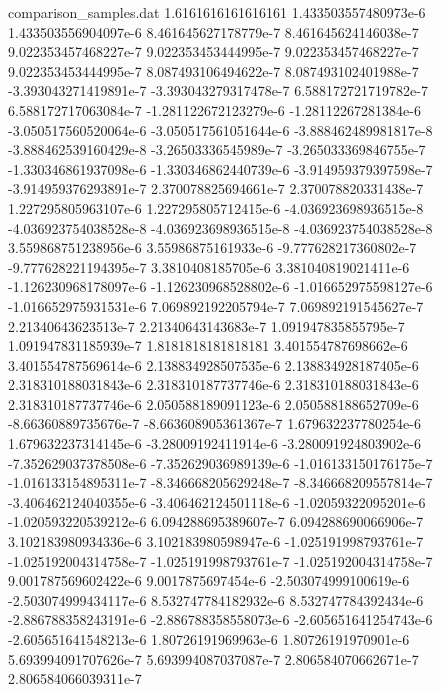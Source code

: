 \begin{filecontents}{comparison_samples.dat}
1.6161616161616161  1.433503557480973e-6    1.433503556904097e-6    8.461645627178779e-7   8.461645624146038e-7   9.022353457468227e-7   9.022353453444995e-7   9.022353457468227e-7   9.022353453444995e-7   8.087493106494622e-7   8.087493102401988e-7   -3.393043271419891e-7   -3.393043279317478e-7   6.588172721719782e-7   6.588172717063084e-7   -1.281122672123279e-6   -1.28112267281384e-6    -3.050517560520064e-6   -3.050517561051644e-6   -3.888462489981817e-8   -3.888462539160429e-8   -3.26503336545989e-7    -3.265033369846755e-7   -1.330346861937098e-6   -1.330346862440739e-6   -3.914959379397598e-7   -3.914959376293891e-7   2.370078825694661e-7   2.370078820331438e-7   1.227295805963107e-6   1.227295805712415e-6   -4.036923698936515e-8   -4.036923754038528e-8   -4.036923698936515e-8   -4.036923754038528e-8   3.559868751238956e-6   3.55986875161933e-6    -9.777628217360802e-7   -9.777628221194395e-7   3.3810408185705e-6     3.381040819021411e-6   -1.126230968178097e-6   -1.126230968528802e-6   -1.016652975598127e-6   -1.016652975931531e-6   7.069892192205794e-7   7.069892191545627e-7   2.21340643623513e-7    2.21340643143683e-7    1.091947835855795e-7    1.091947831185939e-7  
1.8181818181818181  3.401554787698662e-6    3.401554787569614e-6    2.138834928507535e-6   2.138834928187405e-6   2.318310188031843e-6   2.318310187737746e-6   2.318310188031843e-6   2.318310187737746e-6   2.050588189091123e-6   2.050588188652709e-6   -8.66360889735676e-7    -8.663608905361367e-7   1.679632237780254e-6   1.679632237314145e-6   -3.28009192411914e-6    -3.280091924803902e-6   -7.352629037378508e-6   -7.352629036989139e-6   -1.016133150176175e-7   -1.016133154895311e-7   -8.346668205629248e-7   -8.346668209557814e-7   -3.406462124040355e-6   -3.406462124501118e-6   -1.02059322095201e-6    -1.020593220539212e-6   6.094288695389607e-7   6.094288690066906e-7   3.102183980934336e-6   3.102183980598947e-6   -1.025191998793761e-7   -1.025192004314758e-7   -1.025191998793761e-7   -1.025192004314758e-7   9.001787569602422e-6   9.0017875697454e-6     -2.503074999100619e-6   -2.503074999434117e-6   8.532747784182932e-6   8.532747784392434e-6   -2.886788358243191e-6   -2.886788358558073e-6   -2.605651641254743e-6   -2.605651641548213e-6   1.80726191969963e-6    1.80726191970901e-6    5.693994091707626e-7   5.693994087037087e-7   2.806584070662671e-7    2.806584066039311e-7  

\end{filecontents}
